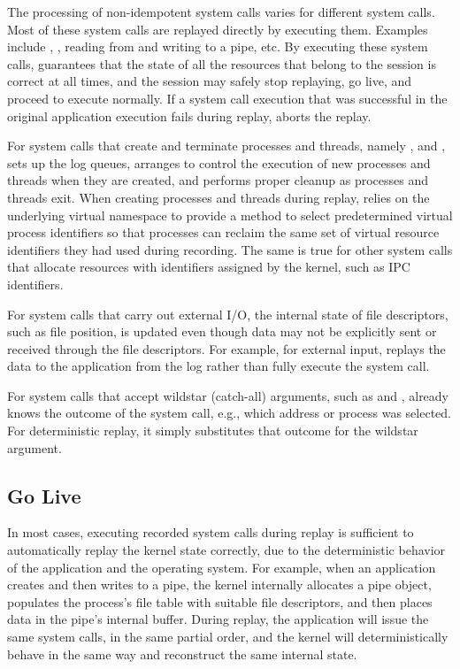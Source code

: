 The processing of non-idempotent system calls varies for 
different system calls.  Most of these system calls are replayed
directly by executing them. Examples include ,
, reading from and writing to a pipe, etc.  By executing
these system calls, \scribe{} guarantees that the state of all the
resources that belong to the session is correct at all times, and the
session may safely stop replaying, go live, and proceed to execute
normally. If a system call execution that was successful in the
original application execution fails during replay, \scribe{} aborts
the replay. 

  

For system calls that create and terminate processes and threads,
namely ,  and , \scribe{} sets up
the log queues, arranges to control the execution of new processes
and threads when they are created, and performs proper cleanup as
processes and threads exit. When creating processes and threads during
replay, \scribe{} relies on the underlying virtual namespace
to provide a method to select predetermined virtual process
identifiers so that processes can reclaim the same set of virtual
resource identifiers they had used during recording.  The same is true
for other system calls that allocate resources with identifiers
assigned by the kernel, such as IPC identifiers.

For system calls that carry out external I/O, the internal state of
file descriptors, such as file position, is updated even though data
may not be explicitly sent or received through the file descriptors. 
For example, for external input, \scribe{} replays the data to the
application from the log rather than fully execute the 
system call.  

For system calls that accept wildstar (catch-all) arguments,
such as  and , \scribe{} already knows the
outcome of the system call, e.g., which address or process was
selected. For deterministic replay, it simply substitutes
that outcome for the wildstar argument.

    

\subsection{Go Live}
\label{scribe:sec:golive}

In most cases, executing recorded system calls during replay is
sufficient to automatically replay the kernel state correctly, due to
the deterministic behavior of the application and the operating
system. For example, when an application creates and then writes to a
pipe, the kernel internally allocates a pipe object, populates the
process's file table with suitable file descriptors, and then places
data in the pipe's internal buffer. During replay, the application
will issue the same system calls, in the same partial order, and the
kernel will deterministically behave in the same way and reconstruct
the same internal state.


